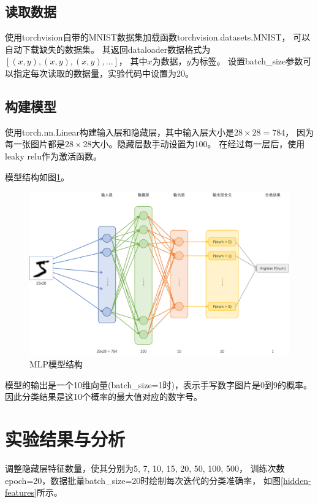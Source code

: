 \documentclass{article}
\begin{document}
\subsection{读取数据}

使用torchvision自带的MNIST数据集加载函数torchvision.datasets.MNIST，
可以自动下载缺失的数据集。
其返回dataloader数据格式为$[(x, y), (x, y), (x, y), ...]$，
其中$x$为数据，$y$为标签。
设置batch\_size参数可以指定每次读取的数据量，实验代码中设置为20。

\subsection{构建模型}

使用torch.nn.Linear构建输入层和隐藏层，其中输入层大小是$28 \times 28 = 784$，
因为每一张图片都是$28 \times 28$大小。隐藏层数手动设置为100。
在经过每一层后，使用leaky relu作为激活函数。

模型结构如图\ref{mlp-model}。

\begin{figure}[H]
    \centering
    \includegraphics[width=\textwidth]{figures/fig_01.png}
    \caption{MLP模型结构}
    \label{mlp-model}
\end{figure}

模型的输出是一个10维向量(batch\_size=1时)，表示手写数字图片是0到9的概率。
因此分类结果是这10个概率的最大值对应的数字号。

\section{实验结果与分析}

调整隐藏层特征数量，使其分别为5, 7, 10, 15, 20, 50, 100, 500，
训练次数epoch=20，数据批量batch\_size=20时绘制每次迭代的分类准确率，
如图\ref{hidden-features}所示。
\end{document}
